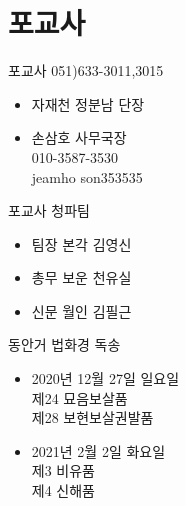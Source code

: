 \documentclass[aspectratio=1610,20pt,xcolor=pdftex,dvipsnames,table,handout]{beamer}
\begin{document}
		\section{포교사}
		\begin{frame} [t,plain]

			\begin{block} {포교사 051)633-3011,3015}
			\setlength{\leftmargini}{1em}			
			\begin{itemize}
				\item 자재천 정분남 단장 	\hrulefill
				\item 손삼호 사무국장 \\ 010-3587-3530 \\ jeamho son353535
			\end{itemize}
			\end{block}						
		\end{frame}					

		\begin{frame} [t,plain]

			\begin{block} {포교사 청파팀 }
			\setlength{\leftmargini}{1em}			
			\begin{itemize}
				\item 팀장 본각 김영신 	\hrulefill
				\item 총무 보운 천유실 	\hrulefill
				\item 신문 월인 김필근 	\hrulefill
			\end{itemize}
			\end{block}						


			\begin{block} {동안거 법화경 독송 }
			\setlength{\leftmargini}{1em}			
			\begin{itemize}
				\item 	\hrulefill 2020년 12월 27일 일요일 \\
						제24 묘음보살품 \\
						제28 보현보살권발품 

				\item 	\hrulefill 2021년 2월 2일 화요일 \\
						제3 비유품 \\
						제4 신해품 
			\end{itemize}
			\end{block}						


		\end{frame}					
\end{document}
